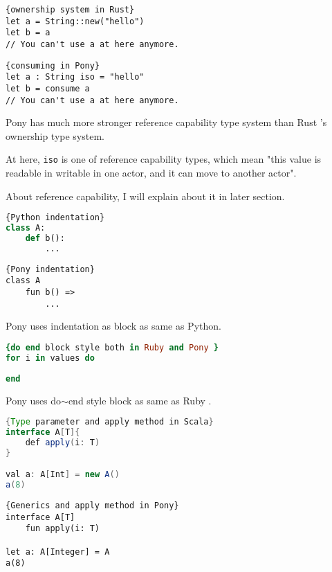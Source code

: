 \documentclass{article}
\begin{document}
\begin{lstlisting}{ownership system in Rust}
let a = String::new("hello")
let b = a
// You can't use a at here anymore.
\end{lstlisting}

\begin{lstlisting}{consuming in Pony}
let a : String iso = "hello"
let b = consume a
// You can't use a at here anymore.
\end{lstlisting}

Pony has much more stronger reference capability type system than Rust \cite{rust} 's ownership type system. 

At here, \texttt{iso} is one of reference capability types, which mean "this value is readable in writable in one actor, and it can move to another actor".

About reference capability, I will explain about it in later section.
\\



\begin{lstlisting}[language=Python]{Python indentation}
class A:
	def b():
		...
\end{lstlisting}

\begin{lstlisting}{Pony indentation}
class A
	fun b() =>
		...
\end{lstlisting}


Pony uses indentation as block as same as Python\cite{python}.\\

\begin{lstlisting}[language=Ruby]{do end block style both in Ruby and Pony }
for i in values do
	
end		
\end{lstlisting}

 Pony uses do$\sim$end style block as same as Ruby \cite{ruby}. \\


\begin{lstlisting}[language=Java]{Type parameter and apply method in Scala}
interface A[T]{
	def apply(i: T)
}	

val a: A[Int] = new A()
a(8)
\end{lstlisting}

\begin{lstlisting}{Generics and apply method in Pony}
interface A[T]
	fun apply(i: T)
	
let a: A[Integer] = A
a(8)	
\end{lstlisting}
\end{document}
